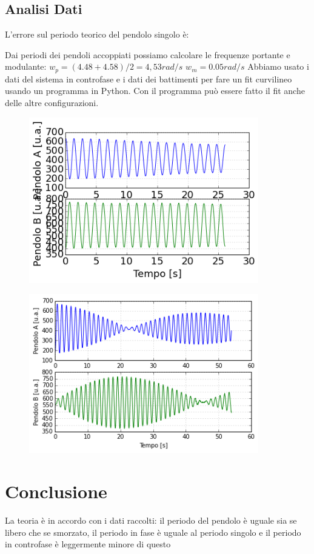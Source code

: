 \documentclass[a4paper,10pt]{article}
\begin{document}
\subsection{Analisi Dati}
L'errore sul periodo teorico del pendolo singolo è:

Dai periodi dei pendoli accoppiati possiamo calcolare le frequenze portante e modulante:
$w_p=(4.48+4.58)/2=4,53 rad/s$
$w_m=0.05 rad/s$
Abbiamo usato i dati del sistema in controfase e i dati dei battimenti per fare un fit curvilineo usando un programma in Python. Con il programma può essere fatto il fit anche delle 
altre configurazioni.

\begin{figure}[!htb]
\begin{center}
\includegraphics[width=10cm]{dati/controfase.png}
\end{center}
\end{figure}

\begin{figure}[!htb]
\begin{center}
\includegraphics[width=10cm]{dati/battimenti.png}
\end{center}
\end{figure}



\section{Conclusione}
La teoria è in accordo con i dati raccolti: il periodo del pendolo è uguale sia se libero che se smorzato, il periodo in fase è uguale al periodo singolo e il periodo in controfase è 
leggermente minore di questo
\end{document}
